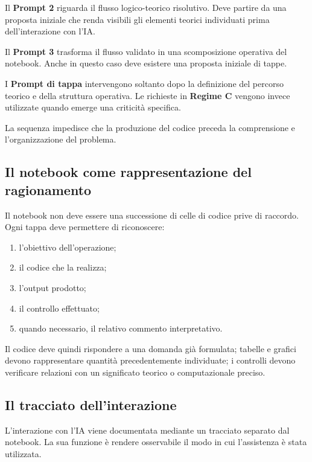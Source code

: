 Il \textbf{Prompt 2} riguarda il flusso logico-teorico risolutivo. Deve partire
da una proposta iniziale che renda visibili gli elementi teorici individuati
prima dell'interazione con l'IA.

Il \textbf{Prompt 3} trasforma il flusso validato in una scomposizione
operativa del notebook. Anche in questo caso deve esistere una proposta
iniziale di tappe.

I \textbf{Prompt di tappa} intervengono soltanto dopo la definizione del
percorso teorico e della struttura operativa. Le richieste in
\textbf{Regime C} vengono invece utilizzate quando emerge una criticit\`{a}
specifica.

La sequenza impedisce che la produzione del codice preceda la comprensione e
l'organizzazione del problema.

\subsection{Il notebook come rappresentazione del ragionamento}

Il notebook non deve essere una successione di celle di codice prive di
raccordo. Ogni tappa deve permettere di riconoscere:

\begin{enumerate}
\item l'obiettivo dell'operazione;

\item il codice che la realizza;

\item l'output prodotto;

\item il controllo effettuato;

\item quando necessario, il relativo commento interpretativo.
\end{enumerate}

Il codice deve quindi rispondere a una domanda gi\`{a} formulata; tabelle e
grafici devono rappresentare quantit\`{a} precedentemente individuate; i
controlli devono verificare relazioni con un significato teorico o
computazionale preciso.

\subsection{Il tracciato dell'interazione}

L'interazione con l'IA viene documentata mediante un
tracciato separato dal notebook. La sua funzione \`{e} rendere osservabile il
modo in cui l'assistenza \`{e} stata utilizzata.

